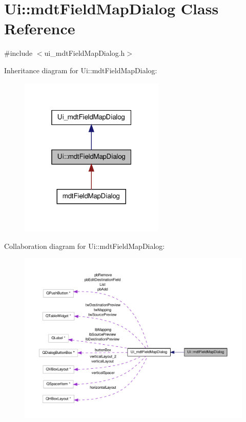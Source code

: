 \hypertarget{class_ui_1_1mdt_field_map_dialog}{\section{Ui\-:\-:mdt\-Field\-Map\-Dialog Class Reference}
\label{class_ui_1_1mdt_field_map_dialog}
}


{\ttfamily \#include $<$ui\-\_\-mdt\-Field\-Map\-Dialog.\-h$>$}



Inheritance diagram for Ui\-:\-:mdt\-Field\-Map\-Dialog\-:\nopagebreak
\begin{figure}[H]
\begin{center}
\leavevmode
\includegraphics[width=196pt]{class_ui_1_1mdt_field_map_dialog__inherit__graph}
\end{center}
\end{figure}


Collaboration diagram for Ui\-:\-:mdt\-Field\-Map\-Dialog\-:\nopagebreak
\begin{figure}[H]
\begin{center}
\leavevmode
\includegraphics[width=350pt]{class_ui_1_1mdt_field_map_dialog__coll__graph}
\end{center}
\end{figure}
